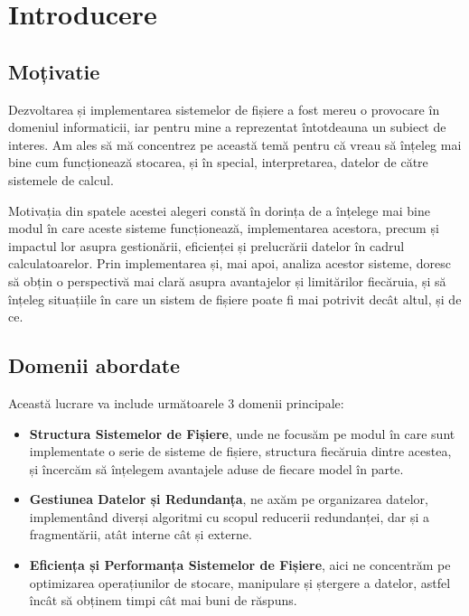 \chapter{Introducere}

\section{Moțivatie}


Dezvoltarea și implementarea sistemelor de fișiere a fost mereu o provocare în domeniul informaticii, iar pentru mine a reprezentat întotdeauna un subiect de interes. Am ales să mă concentrez pe această temă pentru că vreau să înțeleg mai bine cum funcționează stocarea, și în special, interpretarea, datelor de către sistemele de calcul.

Motivația din spatele acestei alegeri constă în dorința de a înțelege mai bine modul în care aceste sisteme funcționează, implementarea acestora, precum și impactul lor asupra gestionării, eficienței și prelucrării datelor în cadrul calculatoarelor. Prin implementarea și, mai apoi, analiza acestor sisteme, doresc să obțin o perspectivă mai clară asupra avantajelor și limitărilor fiecăruia, și să înțeleg situațiile în care un sistem de fișiere poate fi mai potrivit decât altul, și de ce.


\section{Domenii abordate}

Această lucrare va include următoarele 3 domenii principale:

\begin{itemize}
  \item \textbf{ Structura Sistemelor de Fișiere}, unde ne focusăm pe modul în care sunt implementate o serie de sisteme de fișiere, structura fiecăruia dintre acestea, și încercăm să înțelegem avantajele aduse de fiecare model în parte.
  
  \item \textbf{ Gestiunea Datelor și Redundanța}, ne axăm pe organizarea datelor, implementând diverși algoritmi cu scopul reducerii redundanței, dar și a fragmentării, atât interne cât și externe.
  
  \item \textbf{  Eficiența și Performanța Sistemelor de Fișiere}, aici ne concentrăm pe optimizarea operațiunilor de stocare, manipulare și ștergere a datelor, astfel încât să obținem timpi cât mai buni de răspuns.
\end{itemize}






